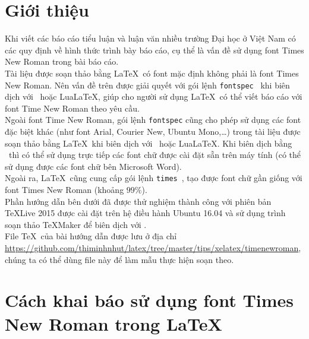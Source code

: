 \documentclass[12pt,a4paper]{article}
\begin{document}
\section{Giới thiệu}
Khi viết các báo cáo tiểu luận và luận văn nhiều trường Đại học ở Việt Nam có các quy định về hình thức trình bày báo cáo, cụ thể là vấn đề sử dụng font Times New Roman trong bài báo cáo.\\

Tài liệu được soạn thảo bằng \LaTeX\ có font mặc định không phải là font Times New Roman. Nên vấn đề trên được giải quyết với gói lệnh \verb|fontspec|~\cite{fontspec-ctan} khi biên dịch với \XeLaTeX\ hoặc Lua\LaTeX, giúp cho người sử dụng \LaTeX\ có thể viết báo cáo với font Time New Roman theo yêu cầu.\\

Ngoài font Time New Roman, gói lệnh \verb|fontspec| cũng cho  phép sử dụng các font đặc biệt khác (như font Arial, Courier New, Ubuntu Mono,\ldots) trong tài liệu được soạn thảo bằng \LaTeX\ khi biên dịch với \XeLaTeX\ hoặc Lua\LaTeX. Khi biên dịch bằng \XeLaTeX\ thì có thể sử dụng trực tiếp các font chữ được cài đặt sẵn trên máy tính (có thể sử dụng được các font chữ bên Microsoft Word).\\

Ngoài ra, \LaTeX\ cũng cung cấp gói lệnh \verb|times|~\cite{times-ctan}, tạo được font chữ gần giống với font Times New Roman (khoảng $99\%$).\\

Phần hướng dẫn bên dưới đã được thử nghiệm thành công với phiên bản \TeX Live 2015 được cài đặt trên hệ điều hành Ubuntu 16.04 và sử dụng trình soạn thảo \TeX Maker để biên dịch với \XeLaTeX. \\

File \TeX\ của bài hướng dẫn được lưu ở địa chỉ \url{https://github.com/thiminhnhut/latex/tree/master/tips/xelatex/timenewroman}, chúng ta có thể dùng file này để làm mẫu thực hiện soạn theo.

\section{Cách khai báo sử dụng font Times New Roman trong \LaTeX}
\end{document}
